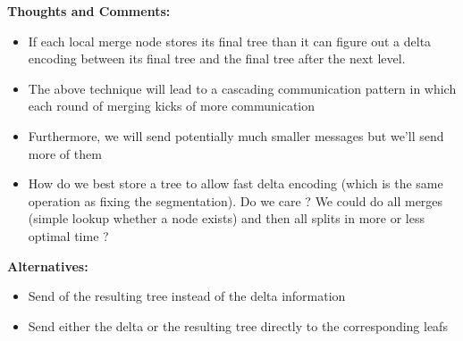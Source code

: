 \documentclass[]{article}
\begin{document}
\noindent
{\bf Thoughts and Comments:}
\begin{itemize}
\item If each local merge node stores its final tree than it can figure out a
  delta encoding between its final tree and the final tree after the next
  level. 
\item The above technique will lead to a cascading communication pattern in
  which each round of merging kicks of more communication
\item Furthermore, we will send potentially much smaller messages but we'll send
  more of them 
\item How do we best store a tree to allow fast delta encoding (which is the
  same operation as fixing the segmentation). Do we care ? We could do all
  merges (simple lookup whether a node exists) and then all splits in more or
  less optimal time ?
\end{itemize}

\noindent
{\bf Alternatives:}
\begin{itemize}
\item Send of the resulting tree instead of the delta information
\item Send either the delta or the resulting tree directly to the corresponding
  leafs
\end{itemize}
\end{document}
